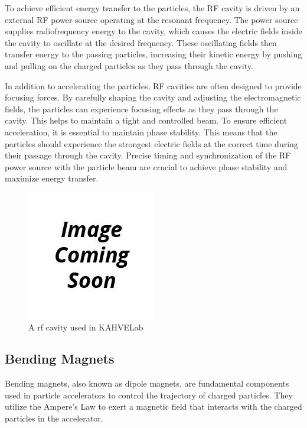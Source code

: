 \documentclass[a4paper,oneside,12pt]{report}
\numberwithin{equation}{chapter}
\begin{document}
To achieve efficient energy transfer to the particles, the RF cavity is driven by an external RF power source operating at the resonant frequency. 
The power source supplies radiofrequency energy to the cavity, which causes the electric fields inside the cavity to oscillate at the desired frequency. 
These oscillating fields then transfer energy to the passing particles, increasing their kinetic energy by pushing and pulling on the charged particles as they pass through the cavity. 

In addition to accelerating the particles, RF cavities are often designed to provide focusing forces. 
By carefully shaping the cavity and adjusting the electromagnetic fields, the particles can experience focusing effects as they pass through the cavity. 
This helps to maintain a tight and controlled beam. To ensure efficient acceleration, it is essential to maintain phase stability. 
This means that the particles should experience the strongest electric fields at the correct time during their passage through the cavity. 
Precise timing and synchronization of the RF power source with the particle beam are crucial to achieve phase stability and maximize energy transfer.
\begin{figure}[H]
    \centering
    \includegraphics[scale=0.75]{./figures/to_be_added.png}
    \caption{A rf cavity used in KAHVELab}
\end{figure}

\subsection{Bending Magnets}
Bending magnets, also known as dipole magnets, are fundamental components used in particle accelerators to control the trajectory of charged particles. 
They utilize the Ampere's Law to exert a magnetic field that interacts with the charged particles in the accelerator. 
\end{document}

